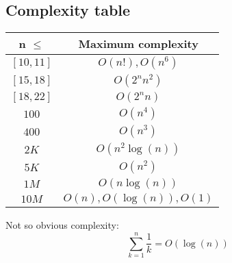     \subsection{Complexity table}
        \begin{center}
            \begin{tabular}{|c|c|}
            \hline
            n $\leq$ & Maximum complexity\\
            \hline

            $[10,11]$ & $O(n!),O(n^6)$ \\
            $[15,18]$ & $O(2^n n^2)$\\
            $[18,22]$ & $O(2^n n)$\\
            $100$ & $O(n^4)$\\
            $400$ & $O(n^3)$\\
            $2K$ & $O(n^2\log(n))$\\
            $5K$ & $O(n^2)$\\
            $1M$ & $O(n\log(n))$\\
            $10M$ & $O(n),O(\log(n)),O(1)$\\

            \hline
            \end{tabular}
        \end{center}

        Not so obvious complexity:
        $$\sum_{k=1}^n \frac{1}{k} = O(\log(n))$$
